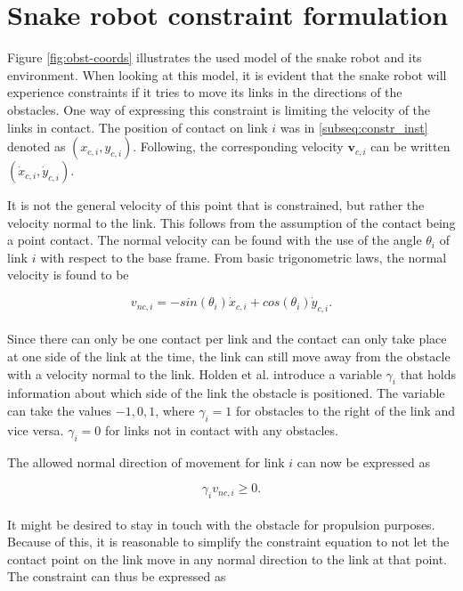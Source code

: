 \section{Snake robot constraint formulation}\label{seq:constraints}

Figure \ref{fig:obst-coords} illustrates the used model of the snake robot and its environment. When looking at this model, it is evident that the snake robot will experience constraints if it tries to move its links in the directions of the obstacles. One way of expressing this constraint is limiting the velocity of the links in contact. The position of contact on link $i$ was in \ref{subseq:constr_inst} denoted as $(x_{c,i}, y_{c,i})$. Following, the corresponding velocity $\mathbf{v}_{c,i}$ can be written $(\dot{x}_{c,i}, \dot{y}_{c,i})$.

It is not the general velocity of this point that is constrained, but rather the velocity normal to the link. This follows from the assumption of the contact being a point contact. The normal velocity can be found with the use of the angle $\theta_i$ of link $i$ with respect to the base frame. From basic trigonometric laws, the normal velocity is found to be

\begin{equation}\label{eq:norm_vel}
    v_{nc,i} = -sin(\theta_i) \dot{x}_{c,i} + cos(\theta_i) \dot{y}_{c,i}.
\end{equation}
\\
Since there can only be one contact per link and the contact can only take place at one side of the link at the time, the link can still move away from the obstacle with a velocity normal to the link. Holden et al. \cite{holden2014optimal} introduce a variable $\gamma_i$ that holds information about which side of the link the obstacle is positioned. The variable can take the values ${-1, 0, 1}$, where $\gamma_i=1$ for obstacles to the right of the link and vice versa. $\gamma_i=0$ for links not in contact with any obstacles.

The allowed normal direction of movement for link $i$ can now be expressed as

\begin{equation}\label{eq:norm_vel2}
    \gamma_i v_{nc,i} \geq 0.
\end{equation}
\\
It might be desired to stay in touch with the obstacle for propulsion purposes. Because of this, it is reasonable to simplify the constraint equation to not let the contact point on the link move in any normal direction to the link at that point. The constraint can thus be expressed as


